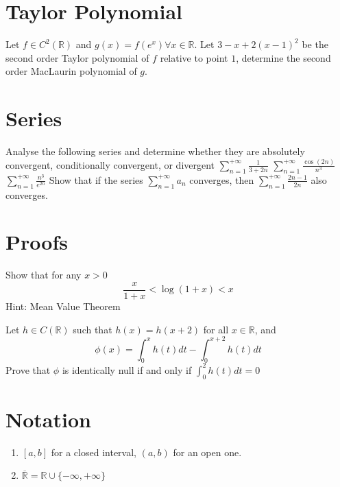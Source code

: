 \documentclass[10pt]{article}
\begin{document}
\section{Taylor Polynomial}
\begin{ExerciseList}
    \Exercise Let $f\in C^2(\mathbb R)$ and $g(x)=f(e^x)\forall x\in\mathbb R$.
    Let $3-x+2(x-1)^2$ be the second order Taylor polynomial of $f$ relative
    to point $1$, determine the second order MacLaurin polynomial of $g$.
\end{ExerciseList}
\section{Series}
\begin{ExerciseList}
    \Exercise Analyse the following series and determine whether they are absolutely convergent, conditionally convergent, or divergent
    \Question $\sum_{n=1}^{+\infty}\frac{1}{3+2n}$
    \Question $\sum_{n=1}^{+\infty}\frac{\cos(2n)}{n^3}$
    \Question $\sum_{n=1}^{+\infty}\frac{n^3}{e^{2n}}$
    \Exercise Show that if the series $\sum_{n=1}^{+\infty}a_n$ converges, then
    $\sum_{n=1}^{+\infty}\frac{2n-1}{2n}$ also converges.
\end{ExerciseList}

\section{Proofs}
\begin{ExerciseList}
    \Exercise Show that for any $x>0$
    $$\frac{x}{1+x} < \log(1+x) < x$$
    Hint: Mean Value Theorem

    \Exercise Let $h\in C(\mathbb R)$ such that $h(x) = h(x+2)$ for all $x\in\mathbb R$, and
    $$\phi(x) = \int_0^x{h(t)dt}-\int_0^{x+2}{h(t)dt}$$
    Prove that $\phi$ is identically null if and only if $\int_0^2 h(t)dt = 0$
\end{ExerciseList}
\section{Notation}
\begin{enumerate}
    \item  $[a,b]$ for a closed interval, $(a,b)$ for an open one.
    \item $\overline{\mathbb R} = \mathbb R \cup \{-\infty, +\infty\}$
\end{enumerate}
\end{document}
